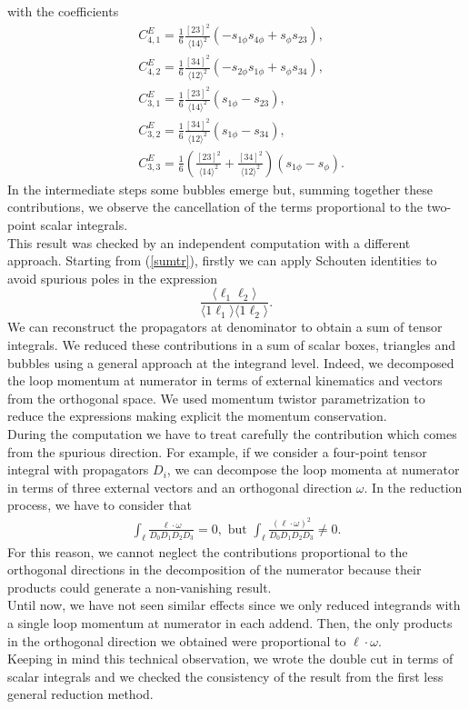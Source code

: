 with the coefficients
\begin{align*}
	&C_{4,1}^E=\frac{1}{6}\frac{[23]^2}{\langle 14 \rangle^2}(-s_{1\phi}s_{4\phi}+s_{\phi}s_{23}), \\
	&C_{4,2}^E=\frac{1}{6}\frac{[34]^2}{\langle 12 \rangle^2}(-s_{2\phi}s_{1\phi}+s_{\phi}s_{34}), \\
	&C_{3,1}^E=\frac{1}{6}\frac{[23]^2}{\langle 14 \rangle^2}(s_{1\phi}-s_{23}), \\
	&C_{3,2}^E=\frac{1}{6}\frac{[34]^2}{\langle 12 \rangle^2}(s_{1\phi}-s_{34}), \\
	&C_{3,3}^E=\frac{1}{6}\left(\frac{[23]^2}{\langle 14 \rangle^2}+\frac{[34]^2}{\langle 12 \rangle^2}\right)(s_{1\phi}-s_\phi).
\end{align*}
In the intermediate steps some bubbles emerge but, summing together these contributions, we observe the cancellation of the terms proportional to the two-point scalar integrals.\\
This result was checked by an independent computation with a different approach. Starting from (\ref{sumtr}), firstly we can apply Schouten identities to avoid spurious poles in the expression
$$
	\frac{\langle \ell_1 \ell_2 \rangle}{\langle 1 \ell_1 \rangle \langle 1 \ell_2\rangle}.
$$
We can reconstruct the propagators at denominator to obtain a sum of tensor integrals. We reduced these contributions in a sum of scalar boxes, triangles and bubbles using a general approach at the integrand level. Indeed, we decomposed the loop momentum at numerator in terms of external kinematics and vectors from the orthogonal space. We used momentum twistor parametrization to reduce the expressions making explicit the momentum conservation.\\
During the computation we have to treat carefully the contribution which comes from the spurious direction. For example, if we consider a four-point tensor integral with propagators $D_i$, we can decompose the loop momenta at numerator in terms of three external vectors and an orthogonal direction $\omega$. In the reduction process, we have to consider that
\begin{align*}
	\int_\ell \frac{\ell\cdot \omega}{D_0 D_1 D_2 D_3}=0, \text{ but }
	\int_\ell \frac{(\ell\cdot \omega)^2}{D_0 D_1 D_2 D_3}\not =0.
\end{align*}
For this reason, we cannot neglect the contributions proportional to the orthogonal directions in the decomposition of the numerator because their products could generate a non-vanishing result.\\
Until now, we have not seen similar effects since we only reduced integrands with a single loop momentum at numerator in each addend. Then, the only products in the orthogonal direction we obtained were proportional to $\ell\cdot \omega$.\\
Keeping in mind this technical observation, we wrote the double cut in terms of scalar integrals and we checked the consistency of the result from the first less general reduction method. 
